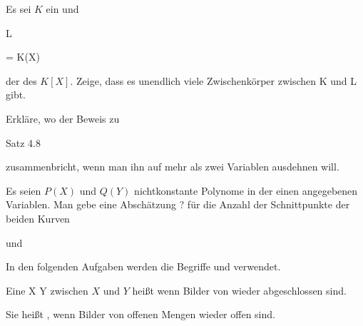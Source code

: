 {} {}




{}


{


Es sei $K$ ein
 und


\mavergleichskette


{\vergleichskette


{ L
}


{ = }{ K(X)
}


{  }{
}


{    }{
}


{   }{
}


}
{}{}{}
der
des
$K[X]$. Zeige, dass es unendlich viele Zwischenkörper zwischen
\mathkor {} {K} {und} {L} {}
gibt.


}


{} {}




{}


{


Erkläre, wo der
Beweis
 zu

Satz 4.8

zusammenbricht, wenn man ihn auf mehr als zwei Variablen ausdehnen will.


}


{} {}




{}


{


Es seien $P(X)$ und $Q(Y)$ nichtkonstante Polynome in der einen angegebenen Variablen. Man gebe eine Abschätzung
 {?} {}
für die Anzahl der Schnittpunkte der beiden Kurven


 und




}


{} {}


In den folgenden Aufgaben werden die Begriffe  {} und  {} verwendet.


Eine
 { X } { Y
} {}
zwischen
$X$ und $Y$ heißt  wenn Bilder von
wieder abgeschlossen sind.


Sie heißt  {,} wenn Bilder von offenen Mengen wieder offen sind.


